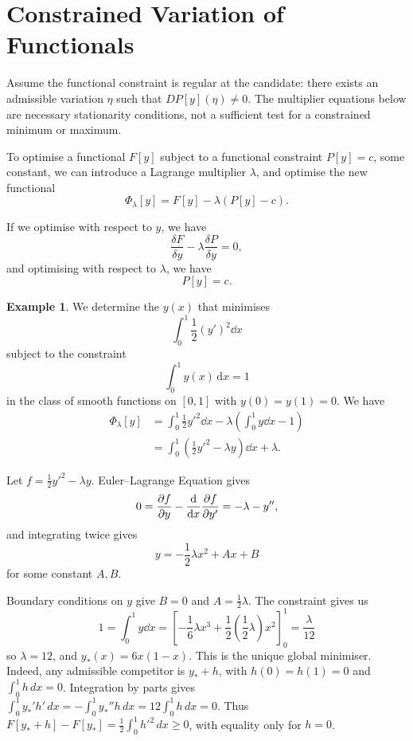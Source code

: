 \documentclass[11pt]{article}
\numberwithin{equation}{section}
\theoremstyle{definition}
\newtheorem{example}[theorem]{Example}
\theoremstyle{remark}
\newcommand{\pqty}[1]{\left(#1\right)}
\newcommand{\bqty}[1]{\left[#1\right]}
\newcommand{\ccintv}[2]{[#1,#2]}
\newcommand{\fdv}[2]{\frac{\delta #1}{\delta #2}}
\begin{document}
\section{Constrained Variation of Functionals}

Assume the functional constraint is regular at the candidate: there exists an
admissible variation \(\eta\) such that \(DP[y](\eta)\ne0\).
The multiplier equations below are necessary stationarity conditions, not a
sufficient test for a constrained minimum or maximum.

To optimise a functional \(F\bqty{y}\) subject to a functional constraint \(P\bqty{y} = c\), some constant, we can introduce a Lagrange multiplier \(\lambda\), and optimise the new functional
\[
    \Phi_\lambda \bqty{y} = F\bqty{y} - \lambda \pqty{P\bqty{y} - c}.
\]

If we optimise with respect to \(y\), we have
\[
    \fdv{F}{y} - \lambda \fdv{P}{y} = 0,
\]
and optimising with respect to \(\lambda\), we have
\[
    P\bqty{y} = c.
\]

\begin{example}\label{variation-unit-0050}
    We determine the \(y\pqty{x}\) that minimises
    \[
        \int_{0}^{1} \frac{1}{2} \pqty{y'}^2 \dd{x}
    \]
    subject to the constraint
    \[
        \int_0^1 y(x)\,\mathrm dx=1
    \]
    in the class of smooth functions on \(\ccintv{0}{1}\) with \(y\pqty{0} = y\pqty{1} = 0\). We have
    \begin{align*}
        \Phi_\lambda \bqty{y} &= \int_{0}^{1} \frac{1}{2} y'^2 \dd{x} - \lambda \pqty{\int_{0}^{1} y \dd{x} - 1} \\
        &= \int_{0}^{1} \pqty{\frac{1}{2} y'^2 - \lambda y} \dd{x} + \lambda.
    \end{align*}

    Let \(f = \frac{1}{2} y'^2 - \lambda y\). Euler--Lagrange Equation gives
    \[
        0 = \pdv{f}{y} - \dv{x}\pdv{f}{y'} = -\lambda - y'',
    \]
    and integrating twice gives
    \[
        y = - \frac{1}{2} \lambda x^2 + Ax + B
    \]
    for some constant \(A, B\).

    Boundary conditions on \(y\) give \(B = 0\) and \(A = \frac{1}{2} \lambda\). The constraint gives us
    \[
        1 = \int_{0}^{1} y \dd{x} = \bqty{- \frac{1}{6} \lambda x^3 + \frac{1}{2} \pqty{\frac{1}{2} \lambda} x^2}_{0}^{1} = \frac{\lambda}{12}
    \]
    so \(\lambda = 12\), and \(y_*(x)=6x(1-x)\).
    This is the unique global minimiser. Indeed, any admissible competitor is
    \(y_*+h\), with \(h(0)=h(1)=0\) and \(\int_0^1h\,dx=0\). Integration by parts gives
    \(\int_0^1 y_*'h'\,dx=-\int_0^1y_*''h\,dx=12\int_0^1h\,dx=0\).
    Thus \(F[y_*+h]-F[y_*]=\tfrac12\int_0^1h'^2\,dx\ge0\), with equality only for \(h=0\).
\end{example}
\end{document}

